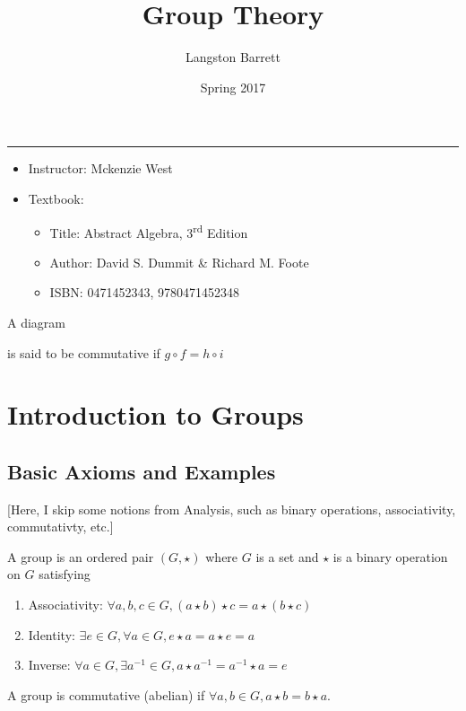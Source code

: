 \documentclass[a5paper]{article}
\begin{document}
\title{Group Theory}
\author{Langston Barrett}
\date{Spring 2017}
\maketitle
\tableofcontents
\vspace{1em}
\hrule
\vspace{1em}

\begin{itemize}
  \item Instructor: Mckenzie West
  \item Textbook:
    \begin{itemize}
      \item Title: Abstract Algebra, 3\textsuperscript{rd} Edition
      \item Author: David S. Dummit \& Richard M. Foote
      \item ISBN: 0471452343, 9780471452348
    \end{itemize}
\end{itemize}

\begin{definition}
  A diagram 
  \begin{center}
  \end{center}
  is said to be commutative if $g\circ f = h\circ i$
\end{definition}

\section{Introduction to Groups}

\subsection{Basic Axioms and Examples}
[Here, I skip some notions from Analysis, such as binary operations,
associativity, commutativty, etc.]

\begin{definition}
	A group is an ordered pair $(G, \star)$ where $G$ is a set and $\star$ is a
  binary operation on $G$ satisfying
  \begin{enumerate}
    \item Associativity: $\forall a,b,c\in G,(a\star b)\star c = a\star (b\star c)$
    \item Identity: $\exists e\in G,\forall a\in G, e\star a=a\star e=a$
    \item Inverse: $\forall a\in G, \exists a^{-1}\in G,a\star a^{-1}=a^{-1}\star a = e$
  \end{enumerate}

  A group is commutative (abelian) if $\forall a,b\in G, a\star b=b\star a$.
\end{definition}
\end{document}
